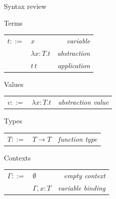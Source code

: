 \documentclass[8pt]{beamer}
\begin{document}
\begin{frame}{Syntax review}
    \begin{block}{Terms}
        \begin{center}
            \begin{tabular}{ r l r }
              $t ::= $ & $x$ & \emph{variable} \\
               & $\lambda x:T.t$ & \emph{abstraction} \\
               & $t \, t$ & \emph{application} \\
            \end{tabular}
        \end{center}
    \end{block}
    \begin{block}{Values}
        \begin{center}
            \begin{tabular}{ r l r }
              $v ::= $ & $\lambda x:T.t$ & \emph{abstraction value} \\
            \end{tabular}
        \end{center}
    \end{block}
    \begin{block}{Types}
        \begin{center}
            \begin{tabular}{ r l r }
              $T ::= $ & $T \rightarrow T$ & \emph{function type} \\
            \end{tabular}
        \end{center}
    \end{block}
    \begin{block}{Contexts}
        \begin{center}
            \begin{tabular}{ r l r }
              $\Gamma ::= $ & $\emptyset$ & \emph{empty context} \\
               & $\Gamma, x:T$ & \emph{variable binding} \\
            \end{tabular}
        \end{center}
    \end{block}
\end{frame}
\end{document}
